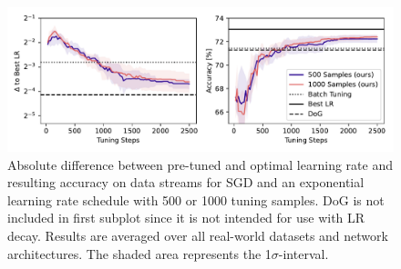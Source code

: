 \documentclass{article} %
\begin{document}
\begin{figure}[!hb]
   \centering
   \includegraphics[width=\textwidth]{figures/pretune_all_acc_lr_exp_schedule.pdf}
   \caption{Absolute difference between pre-tuned and optimal learning rate and resulting accuracy on data streams for SGD and an exponential learning rate schedule with 500 or 1000 tuning samples. DoG is not included in first subplot since it is not intended for use with LR decay. Results are averaged over all real-world datasets and network architectures. The shaded area represents the 1$\sigma$-interval.}\label{fig:pretune_lr_accuracy}
\end{figure}
\end{document}
